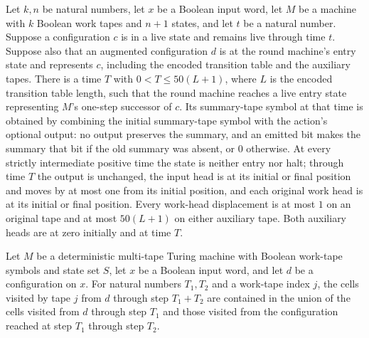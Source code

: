 \begin{theorem}
\label{Turing.StepBlock.roundTM_effect}
\leanok
{}
Let $k,n$ be natural numbers, let $x$ be a Boolean input word, let $M$ be a machine with
$k$ Boolean work tapes and $n+1$ states, and let $t$ be a natural number. Suppose a
configuration $c$ is in a live state and remains live through time $t$. Suppose also
that an augmented configuration $d$ is at the round machine's entry state and represents
$c$, including the encoded transition table and the auxiliary tapes. There is a time $T$
with $0<T\le 50(L+1)$, where $L$ is the encoded transition table length, such that the
round machine reaches a live entry state representing $M$'s one-step successor of $c$.
Its summary-tape symbol at that time is obtained by combining the initial summary-tape
symbol with the action's optional output: no output preserves the summary, and an
emitted bit makes the summary that bit if the old summary was absent, or $0$ otherwise.
At every strictly intermediate positive time the state is neither entry nor halt;
through time $T$ the output is unchanged, the input head is at its initial or final
position and moves by at most one from its initial position, and each original work head
is at its initial or final position. Every work-head displacement is at most $1$ on an
original tape and at most $50(L+1)$ on either auxiliary tape. Both auxiliary heads are
at zero initially and at time $T$.
\end{theorem}

\begin{lemma}
\label{Turing.MultiTapeTM.visitedByTapeHead_add_subset}
\leanok
{}
Let $M$ be a deterministic multi-tape Turing machine with Boolean work-tape symbols and
state set $S$, let $x$ be a Boolean input word, and let $d$ be a configuration on $x$.
For natural numbers $T_1,T_2$ and a work-tape index $j$, the cells visited by tape $j$
from $d$ through step $T_1+T_2$ are contained in the union of the cells visited from $d$
through step $T_1$ and those visited from the configuration reached at step $T_1$
through step $T_2$.
\end{lemma}

